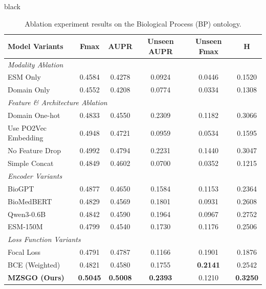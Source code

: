 \documentclass{article}
\begin{document}
\begin{color}{black}
\begin{table}[htbp]
    \centering
    \caption{Ablation experiment results on the Biological Process (BP) ontology.}
    \label{tab:ablation_bp}
    \renewcommand{\arraystretch}{1.1}
    \begin{tabular}{l c c c c c}
        \toprule
        \textbf{Model Variants} & \textbf{Fmax} & \textbf{AUPR} & \textbf{Unseen AUPR} & \textbf{Unseen Fmax} & \textbf{H} \\
        \midrule
        \multicolumn{6}{l}{\textit{Modality Ablation}} \\
        ESM Only & 0.4584 & 0.4278 & 0.0924 & 0.0446 & 0.1520 \\
        Domain Only & 0.4552 & 0.4208 & 0.0774 & 0.0334 & 0.1308 \\
        \midrule
        \multicolumn{6}{l}{\textit{Feature \& Architecture Ablation}} \\
        Domain One-hot & 0.4833 & 0.4550 & 0.2309 & 0.1182 & 0.3066 \\
        Use PO2Vec Embedding & 0.4948 & 0.4721 & 0.0959 & 0.0534 & 0.1595 \\
        No Feature Drop & 0.4992 & 0.4794 & 0.2231 & 0.1440 & 0.3047 \\
        Simple Concat & 0.4849 & 0.4602 & 0.0700 & 0.0352 & 0.1215 \\
        \midrule
        \multicolumn{6}{l}{\textit{Encoder Variants}} \\
        BioGPT & 0.4877 & 0.4650 & 0.1584 & 0.1153 & 0.2364 \\
        BioMedBERT & 0.4829 & 0.4569 & 0.1801 & 0.0931 & 0.2608 \\
        Qwen3-0.6B & 0.4842 & 0.4590 & 0.1964 & 0.0967 & 0.2752 \\
        ESM-150M & 0.4799 & 0.4540 & 0.1730 & 0.1176 & 0.2506 \\
        \midrule
        \multicolumn{6}{l}{\textit{Loss Function Variants}} \\
        Focal Loss & 0.4791 & 0.4787 & 0.1166 & 0.1901 & 0.1876 \\
        BCE (Weighted) & 0.4821 & 0.4580 & 0.1755 & \textbf{0.2141} & 0.2542 \\
        \midrule
        \textbf{MZSGO (Ours)} & \textbf{0.5045} & \textbf{0.5008} & \textbf{0.2393} & 0.1210 & \textbf{0.3250} \\
        \bottomrule
    \end{tabular}
\end{table}


\end{color}
\end{document}
